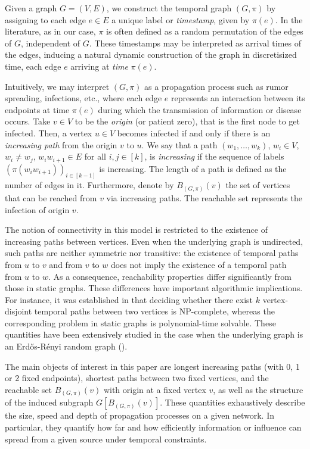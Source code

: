 \documentclass[11pt]{article}
\numberwithin{equation}{section}
\theoremstyle{definition}
\begin{document}
Given a graph $G=(V,E)$, we construct the temporal graph $(G,\pi)$ by assigning to each edge $e \in E$ a unique label or \emph{timestamp}, given by $\pi(e)$. In the literature, as in our case, $\pi$ is often defined as a random permutation of the edges of $G$, independent of $G$. These timestamps may be interpreted as arrival times of the edges, inducing a natural dynamic construction of the graph in discretisized time, each edge $e$ arriving at \emph{time} $\pi(e)$.

Intuitively, we may interpret $(G,\pi)$ as a propagation process such as rumor spreading, infections, etc., where each edge $e$ represents an interaction between its endpoints at time $\pi(e)$ during which the transmission of information or disease occurs. Take $v \in V$ to be the \emph{origin} (or patient zero), that is the first node to get infected. Then, a vertex $u \in V$ becomes infected if and only if there is an \emph{increasing path} from the origin $v$ to $u$. We say that a path $(w_1,\ldots,w_k)$, $w_i \in V$, $w_i\neq w_j$, $w_iw_{i+1}\in E$ for all $i,j \in [k]$, is \emph{increasing} if the sequence of labels $(\pi(w_i w_{i+1}))_{i \in [k-1]}$ is increasing. The length of a path is defined as the number of edges in it. Furthermore, denote by $B_{(G,\pi)}(v)$ the set of vertices that can be reached from $v$ via increasing paths. The reachable set represents the infection of origin $v$. 

The notion of connectivity in this model is restricted to the existence of increasing paths between vertices. Even when the underlying graph is undirected, such paths are neither symmetric nor transitive: the existence of temporal paths from $u$ to $v$ and from $v$ to $w$ does not imply the existence of a temporal path from $u$ to $w$. As a consequence, reachability properties differ significantly from those in static graphs.
These differences have important algorithmic implications. For instance, it was established in \cite{KKK02} that deciding whether there exist $k$ vertex-disjoint temporal paths between two vertices is NP-complete, whereas the corresponding problem in static graphs is polynomial-time solvable. 
These quantities have been extensively studied in the case when the underlying graph is an Erd\H{o}s-Rényi random graph (\cite{AFST20, BCCKRRZ23, CRRZ24, BKL24,AtDeLu25a,AtDeLu25d}).

The main objects of interest in this paper are longest increasing paths (with 0, 1 or 2 fixed endpoints), shortest paths between two fixed vertices, and the reachable set $B_{(G,\pi)}(v)$ with origin at a fixed vertex $v$, as well as the structure of the induced subgraph $G[B_{(G,\pi)}(v)]$. These quantities exhaustively describe the size, speed and depth of propagation processes on a given network. In particular, they quantify how far and how efficiently information or influence can spread from a given source under temporal constraints.
\end{document}

